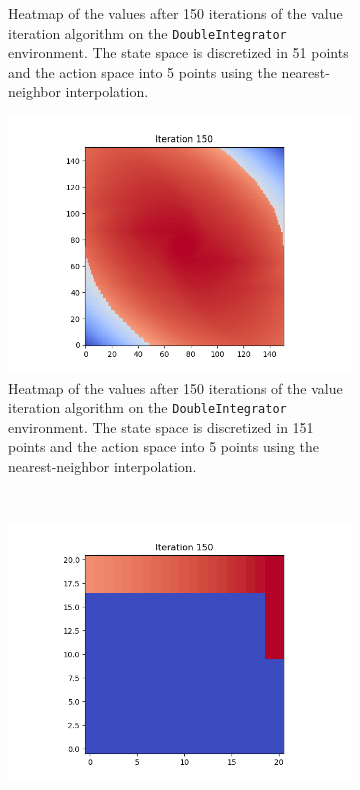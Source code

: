 \documentclass{article}
\begin{document}
\begin{enumerate}[(a)]
\begin{figure}[h!]
\begin{subfigure}{0.3\textwidth}
        \caption{Heatmap of the values after 150 iterations of the value iteration algorithm on the \texttt{DoubleIntegrator} environment. 
                The state space is discretized in 51 points and the action space into 5 points using the nearest-neighbor interpolation.}
    \end{subfigure}
        \hspace{0.1 in}
    \begin{subfigure}{0.3\textwidth}
        \centering
        \includegraphics[width=\textwidth]{figures/part_2_a_c.png}
        \caption{Heatmap of the values after 150 iterations of the value iteration algorithm on the \texttt{DoubleIntegrator} environment. 
                The state space is discretized in 151 points and the action space into 5 points using the nearest-neighbor interpolation.}
    \end{subfigure}
    \\
    \centering
    \begin{subfigure}{0.3\textwidth}
        \centering
        \includegraphics[width=\textwidth]{figures/part_2_moutain-car_s-21.png}

\end{subfigure}
\end{figure}
\end{enumerate}
\end{document}
